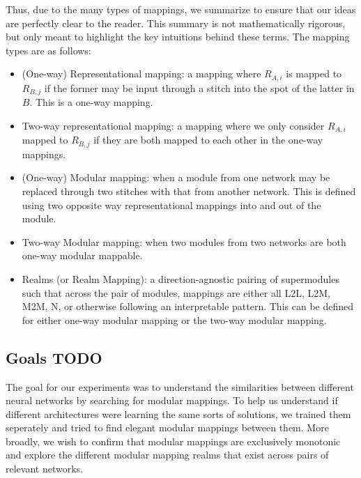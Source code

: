 \documentclass{article} %
\begin{document}
Thus, due to the many types of mappings, we summarize to ensure that our ideas are perfectly clear to the reader. This summary is not mathematically rigorous, but
only meant to highlight the key intuitions behind these terms. The mapping types are as follows:
\begin{itemize}
   \item (One-way) Representational mapping: a mapping where \(R_{A,i}\) is mapped to \(R_{B,j}\) if the former may be input through a stitch into the spot of the latter in \(B\). This is a one-way mapping.
   \item Two-way representational mapping: a mapping where we only consider \(R_{A,i}\) mapped to \(R_{B,j}\) if they are both mapped to each other in the one-way mappings.
   \item (One-way) Modular mapping: when a module from one network may be replaced through two stitches with that from another network. This is defined using two opposite way representational mappings into and out of the module.
   \item Two-way Modular mapping: when two modules from two networks are both one-way modular mappable.
   \item Realms (or Realm Mapping): a direction-agnostic pairing of supermodules such that across the pair of modules, mappings are either all L2L, L2M, M2M, N, or otherwise following an interpretable pattern. This can be defined for either one-way modular mapping or the two-way modular mapping.
\end{itemize}

\subsection{Goals TODO}
The goal for our experiments was to understand the similarities between different neural networks by searching
for modular mappings. To help us understand if different architectures were learning the same sorts of solutions,
we trained them seperately and tried to find elegant modular mappings between them. More broadly, we wish to confirm
that modular mappings are exclusively monotonic and explore the different modular mapping realms that exist across pairs
of relevant networks.

\end{document}
